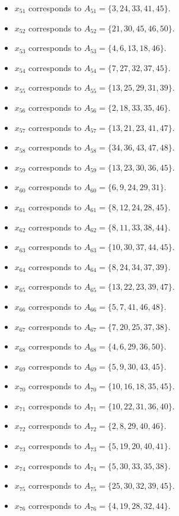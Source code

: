 \documentclass[11pt]{article}
\begin{document}
\begin{itemize}
\item $x_{51}$ corresponds to $A_{51}=\{3, 24, 33, 41, 45\}$.
\item $x_{52}$ corresponds to $A_{52}=\{21, 30, 45, 46, 50\}$.
\item $x_{53}$ corresponds to $A_{53}=\{4, 6, 13, 18, 46\}$.
\item $x_{54}$ corresponds to $A_{54}=\{7, 27, 32, 37, 45\}$.
\item $x_{55}$ corresponds to $A_{55}=\{13, 25, 29, 31, 39\}$.
\item $x_{56}$ corresponds to $A_{56}=\{2, 18, 33, 35, 46\}$.
\item $x_{57}$ corresponds to $A_{57}=\{13, 21, 23, 41, 47\}$.
\item $x_{58}$ corresponds to $A_{58}=\{34, 36, 43, 47, 48\}$.
\item $x_{59}$ corresponds to $A_{59}=\{13, 23, 30, 36, 45\}$.
\item $x_{60}$ corresponds to $A_{60}=\{6, 9, 24, 29, 31\}$.
\item $x_{61}$ corresponds to $A_{61}=\{8, 12, 24, 28, 45\}$.
\item $x_{62}$ corresponds to $A_{62}=\{8, 11, 33, 38, 44\}$.
\item $x_{63}$ corresponds to $A_{63}=\{10, 30, 37, 44, 45\}$.
\item $x_{64}$ corresponds to $A_{64}=\{8, 24, 34, 37, 39\}$.
\item $x_{65}$ corresponds to $A_{65}=\{13, 22, 23, 39, 47\}$.
\item $x_{66}$ corresponds to $A_{66}=\{5, 7, 41, 46, 48\}$.
\item $x_{67}$ corresponds to $A_{67}=\{7, 20, 25, 37, 38\}$.
\item $x_{68}$ corresponds to $A_{68}=\{4, 6, 29, 36, 50\}$.
\item $x_{69}$ corresponds to $A_{69}=\{5, 9, 30, 43, 45\}$.
\item $x_{70}$ corresponds to $A_{70}=\{10, 16, 18, 35, 45\}$.
\item $x_{71}$ corresponds to $A_{71}=\{10, 22, 31, 36, 40\}$.
\item $x_{72}$ corresponds to $A_{72}=\{2, 8, 29, 40, 46\}$.
\item $x_{73}$ corresponds to $A_{73}=\{5, 19, 20, 40, 41\}$.
\item $x_{74}$ corresponds to $A_{74}=\{5, 30, 33, 35, 38\}$.
\item $x_{75}$ corresponds to $A_{75}=\{25, 30, 32, 39, 45\}$.
\item $x_{76}$ corresponds to $A_{76}=\{4, 19, 28, 32, 44\}$.

\end{itemize}
\end{document}
